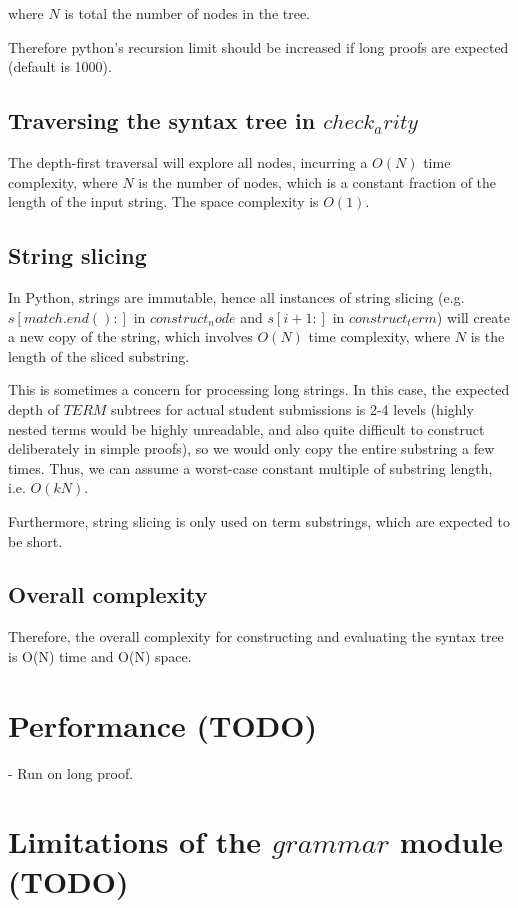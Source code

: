 where $N$ is total the number of nodes in the tree.

Therefore python's recursion limit should be increased if long proofs are expected (default is 1000).

\subsection{Traversing the syntax tree in $check_arity$}
The depth-first traversal will explore all nodes, incurring a $O(N)$ time complexity, where $N$ is the number of nodes, which is a constant fraction of the length of the input string. The space complexity is $O(1)$.

\subsection{String slicing}

In Python, strings are immutable, hence all instances of string slicing (e.g. $s[match.end():]$ in $construct_node$ and $s[i+1:]$ in $construct_term$) will create a new copy of the string, which involves $O(N)$ time complexity, where $N$ is the length of the sliced substring.

This is sometimes a concern for processing long strings. In this case, the expected depth of $TERM$ subtrees for actual student submissions is 2-4 levels (highly nested terms would be highly unreadable, and also quite difficult to construct deliberately in simple proofs), so we would only copy the entire substring a few times. Thus, we can assume a worst-case constant multiple of substring length, i.e. $O(kN)$.

Furthermore, string slicing is only used on term substrings, which are expected to be short.

\subsection{Overall complexity}

Therefore, the overall complexity for constructing and evaluating the syntax tree is O(N) time and O(N) space.

\section{Performance (TODO)}
- Run on long proof.

\section{Limitations of the $grammar$ module (TODO)}


